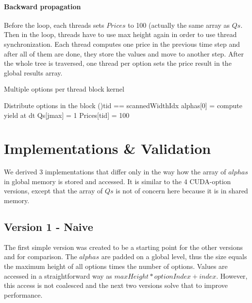 \paragraph{Backward propagation}
Before the loop, each threads sets $\mathit{Prices}$ to 100 (actually the same array as $\mathit{Qs}$. Then in the loop, threads have to use max height again in order to use thread synchronization. Each thread computes one price in the previous time step and after all of them are done, they store the values and move to another step. After the whole tree is traversed, one thread per option sets the price result in the global results array.

\pagebreak
\begin{algorithm}[H]
\DontPrintSemicolon
\caption{Multiple options per thread block kernel\label{alg:cuda-multi}}

Distribute options in the block\;
\If(){tid == scannedWidthIdx}{
    alphas[0] = compute yield at dt
    Qs[jmax] = 1
}
\;
\;
Prices[tid] = 100
\;

\end{algorithm}

\section{Implementations \& Validation}
We derived 3 implementations that differ only in the way how the array of $\mathit{alphas}$ in global memory is stored and accessed. It is similar to the 4 CUDA-option versions, except that the array of $\mathit{Qs}$ is not of concern here because it is in shared memory.

\subsection*{Version 1 - Naive}
The first simple version was created to be a starting point for the other versions and for comparison. The $\mathit{alphas}$ are padded on a global level, thus the size equals the maximum height of all options times the number of options. Values are accessed in a straightforward way as $\mathit{maxHeight} * \mathit{optionIndex} + \mathit{index}$. However, this access is not coalesced and the next two versions solve that to improve performance.

